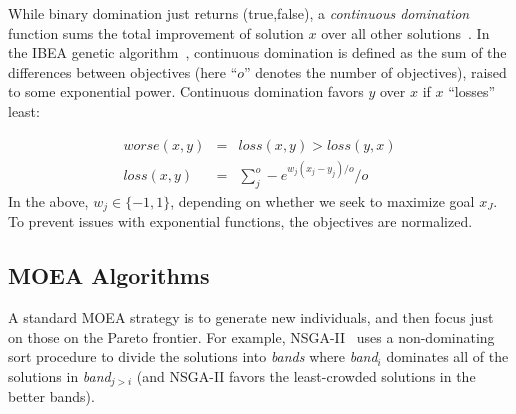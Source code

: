 \documentclass[10pt,journal,compsoc]{IEEEtran}
\begin{document}
While binary domination just returns (true,false), a {\em continuous domination} function sums the total improvement of solution $x$ over all other solutions~\cite{Zitzler04indicator-basedselection}.
In the IBEA genetic algorithm~\cite{Zitzler04indicator-basedselection}, continuous domination is defined as the sum of the differences between objectives (here ``$o$'' denotes the number of objectives), raised to some exponential power.
Continuous domination favors $y$ over $x$ if $x$ ``losses'' least:

\begin{equation}\label{eq:cdom}
\begin{array}{rcl}
\textit{worse}(x,y)& =& \textit{loss}(x,y) > \textit{loss}(y,x)\\
\textit{loss}(x,y)& = &\sum_j^o -e^{w_j(x_j - y_j)/o	} / o
\end{array}
\end{equation}
In the above, $w_j\in \{-1,1\}$, depending on whether we seek to maximize goal $x_J$.   
To prevent issues with exponential functions, the objectives are normalized.


\subsection{MOEA Algorithms}\label{sec:algo}
A standard MOEA strategy is to generate new individuals, and then focus just on those on the Pareto frontier. 
For example, NSGA-II~\cite{deb00afast} uses a non-dominating sort procedure to divide the solutions into {\em bands} where {\em band}$_i$ dominates all of the solutions in {\em band}$_{j>i}$ (and NSGA-II favors the least-crowded solutions in the better bands).

 
\end{document}
